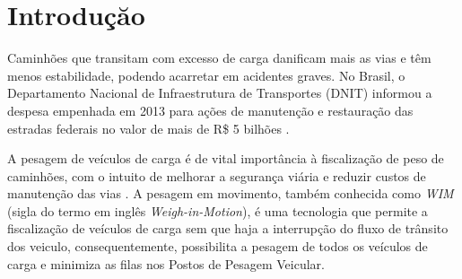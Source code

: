 \documentclass{ufscThesis}
\begin{document}
\capa  
\folhaderosto[comficha] %

\newpage

\newpage

\folhaaprovacao
\paginadedicatoria
\paginaagradecimento
\paginaepigrafe
\paginaresumo
\paginaabstract
\listadefiguras
\listadetabelas 
\listadeabreviaturas
\listadesimbolos
\sumario



\chapter{Introduçăo}\label{introducao}
Caminhões que transitam com excesso de carga danificam mais as vias e têm menos estabilidade, podendo acarretar em acidentes graves. No Brasil, o Departamento Nacional de Infraestrutura de Transportes (DNIT) informou a despesa empenhada em 2013 para ações de manutenção e restauração das estradas federais no valor de mais de R\$ 5 bilhões \cite{tech:relatorio-de-gestao-do-exercicio-de-2013}.

A pesagem de veículos de carga é de vital importância à fiscalização de peso de caminhões, com o intuito de melhorar a segurança viária e reduzir custos de manutenção das vias \cite{techreport:jacob2002wave}. A pesagem em movimento, também conhecida como \textit{WIM} (sigla do termo em inglês \textit{Weigh-in-Motion}), é uma tecnologia que permite a fiscalização de veículos de carga sem que haja a interrupção do fluxo de trânsito dos veiculo, consequentemente, possibilita a pesagem de todos os veículos de carga e minimiza as filas nos Postos de Pesagem Veicular.
\end{document}
